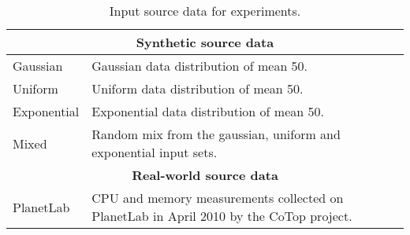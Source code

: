 \begin{table}[h!]
  \centering
  \renewcommand{\arraystretch}{1.5}
  \begin{tabular}{|m{3cm}|p{12cm}|} 
  \hline
  \multicolumn{2}{|c|}{\bf Synthetic source data} \\ 
  
    \hline\hline
	Gaussian
	& 
	Gaussian data distribution of mean 50. \\
    \hline
	
	Uniform
	&
	Uniform data distribution of mean 50.
	\\
    \hline
	
	Exponential
	&
	Exponential data distribution of mean 50.
	\\
	\hline
	
	Mixed
	&
	Random mix from the gaussian, uniform and exponential input sets.
	\\
    \hline\hline
    
    \multicolumn{2}{|c|}{\bf Real-world source data} \\ 
    \hline\hline
	PlanetLab
	&	
	CPU and memory measurements collected on PlanetLab in April 2010 by the CoTop project. 
	\\
    \hline    
  \end{tabular}
  \caption{Input source data for experiments.}
  \label{table:inputs}
\end{table}
